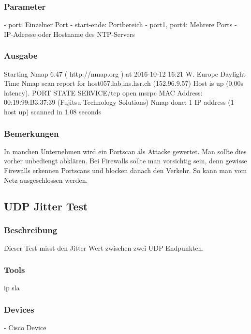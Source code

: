 \documentclass[a4,12pt]{scrartcl}
\begin{document}
\subsubsection{Parameter}
- port: Einzelner Port\newline
- start-ende: Portbereich\newline
- port1, port4: Mehrere Ports\newline
- IP-Adresse oder Hostname des NTP-Servers\newline
\subsubsection{Ausgabe}
Starting Nmap 6.47 ( http://nmap.org ) at 2016-10-12 16:21 W. Europe Daylight Time\newline
Nmap scan report for host057.lab.ins.hsr.ch (152.96.9.57)\newline
Host is up (0.00s latency).\newline
PORT    STATE SERVICE/tcp open  msrpc\newline
MAC Address: 00:19:99:B3:37:39 (Fujitsu Technology Solutions)\newline
Nmap done: 1 IP address (1 host up) scanned in 1.08 seconds\newline
\subsubsection{Bemerkungen}
In manchen Unternehmen wird ein Portscan als Attacke gewertet. Man sollte dies vorher unbediengt abklären.
Bei Firewalls sollte man vorsichtig sein, denn gewisse Firewalls erkennen Portscans und blocken danach den Verkehr. So kann man vom Netz ausgeschlossen werden.

\subsection{UDP Jitter Test}
\subsubsection{Beschreibung}
Dieser Test misst den Jitter Wert zwischen zwei UDP Endpunkten.
\subsubsection{Tools}
ip sla
\subsubsection{Devices}
- Cisco Device
\end{document}
